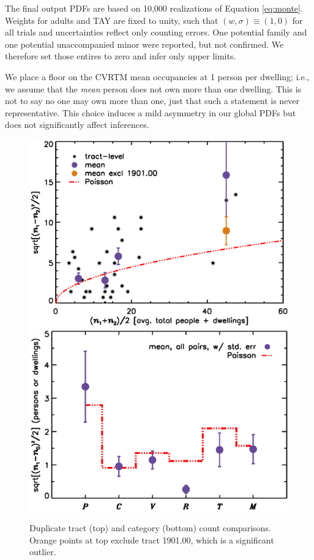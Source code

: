 \documentclass[11pt,twocolumn]{article}
\begin{document}
The final output PDFs are based on 10,000 realizations of Equation \ref{eq:monte}. Weights for 
adults and TAY are fixed to unity, such that 
$(w,\sigma)\equiv(1,0)$ for all trials and uncertainties reflect only counting errors. One potential 
family and one potential unaccompanied minor were reported, but not confirmed. We therefore
set those entires to zero and infer only upper limits.

We place a floor on the CVRTM mean occupancies at 1 person per dwelling; i.e., we assume that the 
{\it mean} person does not own more than one dwelling. This is not to say no one may own more than 
one, just that such a statement is never representative. This choice induces a mild asymmetry in our 
global PDFs but does not significantly affect inferences.

\begin{figure}[t]
\centering
	\includegraphics[width=\linewidth, trim = 1cm 0cm 0cm 0cm]{intDupeChar}\\
	\includegraphics[width=\linewidth, trim = 1cm 0.5cm 0cm 0cm]{catDupeChar}
\caption{Duplicate tract (top) and category (bottom) count comparisons. Orange 
		points at top exclude tract 1901.00, which is a significant outlier.}
\label{fig:dupeChar}
\end{figure}
\end{document}
